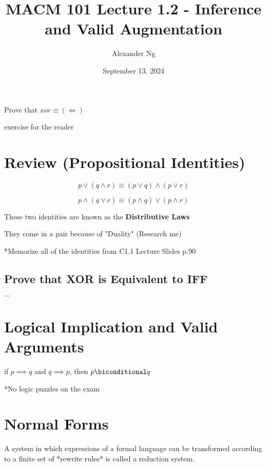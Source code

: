 \documentclass[12pt]{article}
\begin{document}
\title{MACM 101 Lecture 1.2 - Inference and Valid Augmentation}
\author{Alexander Ng}
\date{September 13, 2024}

\maketitle

Prove that $xor \equiv (\iff)$

exercise for the reader

\section{Review (Propositional Identities)}

\begin{equation}
  p \lor (q \land r) \equiv (p \lor q) \land (p \lor r)
\end{equation}

\begin{equation}
  p \land (q \lor r) \equiv (p \land q) \lor (p \land r)
\end{equation}

\caption{These two identities are known as the \textbf{Distributive Laws}}

They come in a pair because of "Duality" (Research me)

*Memorize all of the identities from C1.1 Lecture Slides p.90

\subsection{Prove that XOR is Equivalent to IFF}

$\dots$

\section{Logical Implication and Valid Arguments}

if $p \implies q$ and $q \implies p$, then $p \biconditional q$

*No logic puzzles on the exam

\section{Normal Forms}

A system in which expressions of a formal language can be transformed according
to a finite set of *rewrite rules* is called a reduction system.
\end{document}
